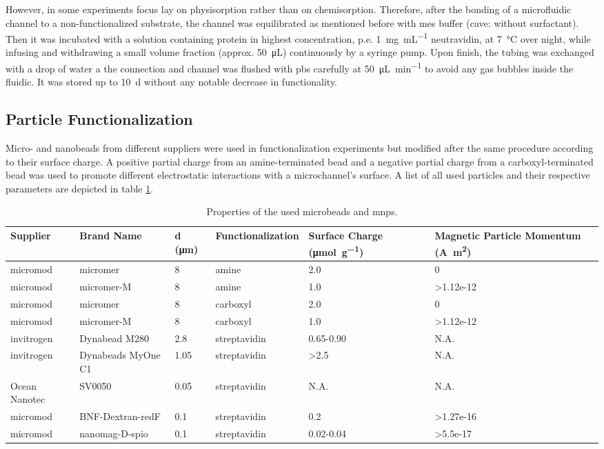 However, in some experiments focus lay on physisorption rather than on chemisorption. Therefore, after the bonding of a microfluidic channel to a non-functionalized substrate, the channel was equilibrated as mentioned before with \gls{mes} buffer (cave: without surfactant). Then it was incubated with a solution containing protein in highest concentration, p.e. \SI{1}{\milli\gram\per\milli\liter} neutravidin, at \SI{7}{\degreeCelsius} over night, while infusing and withdrawing a small volume fraction (approx. \SI{50}{\micro\liter}) continuously by a syringe pump. Upon finish, the tubing was exchanged with a drop of water a the connection and channel was flushed with \gls{pbs} carefully at \SI{50}{\micro\liter\per\minute} to avoid any gas bubbles inside the fluidic. It was stored up to \SI{10}{\day} without any notable decrease in functionality.
\subsection{Particle Functionalization}
\label{sec:meth:particle}
Micro- and nanobeads from different suppliers were used in functionalization experiments but modified after the same procedure according to their surface charge. A positive partial charge from an \gls{amine}-terminated bead and a negative partial charge from a \gls{carboxyl}-terminated bead was used to promote different electrostatic interactions with a microchannel's surface. A list of all used particles and their respective parameters are depicted in table \ref{tab:particles}.
\begin{table}[htb]
	\normalsize
	\begin{tabularx}{\linewidth}{m{17mm}m{22mm}m{8mm}m{20mm}m{20mm}m{20mm}}
		\toprule[1pt]
		Supplier & Brand Name & d (\si{\micro\meter}) & Func\-tio\-na\-li\-za\-tion & Surface Charge (\si{\micro\mol\per\gram})  & Magnetic Particle Momentum (\si{\ampere\square\meter})\\
		\midrule
		micromod & micromer & \num{8} & \gls{amine} & \num{2.0} &  0 \\		
		micromod & micromer-M & \num{8} & \gls{amine}  & \num{1.0} & \num{>1.12e-12} \\ \addlinespace
		micromod & micromer & 8 & \gls{carboxyl} & \num{2.0} &  0\\
		micromod & micromer-M & 8 & \gls{carboxyl}  & \num{1.0} & \num{>1.12e-12}\\ \addlinespace
		invitrogen & Dynabead M280 & \num{2.8} & streptavidin & \num{.65}-\num{.90} &  N.A.\\
		invitrogen & Dynabeads MyOne C1 & \num{1.05} & streptavidin & \num{>2.5} & N.A. \\
		Ocean Nanotec &  SV0050  & \num{0.05}& streptavidin & N.A. & N.A. \\
		micromod & BNF-Dextran-redF &\num{0.1} & streptavidin &\num{0.2} & \num{>1.27e-16} \\
		micromod & nanomag-D-spio & \num{0.1} & streptavidin & \num{0.02}-\num{0.04} & \num{>5.5e-17} \\
		\bottomrule[1.2pt]
	\end{tabularx}
	\caption{Properties of the used microbeads and \glspl{mnp}.}
	\label{tab:particles}
\end{table}
